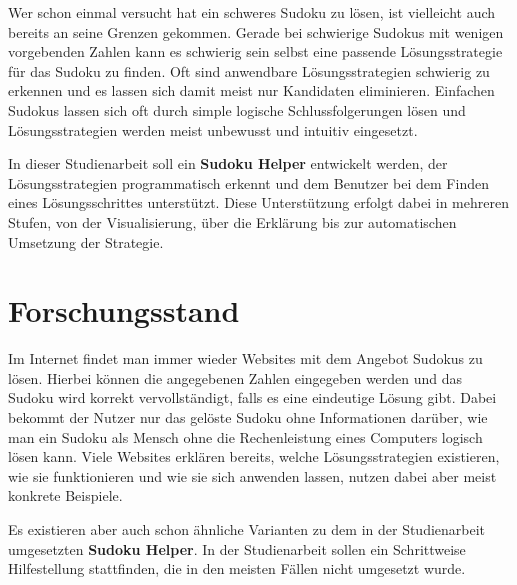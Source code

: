 Wer schon einmal versucht hat ein schweres Sudoku  zu lösen, ist vielleicht auch bereits an seine Grenzen gekommen. Gerade bei schwierige Sudokus mit wenigen vorgebenden Zahlen kann es schwierig sein selbst eine passende Lösungsstrategie für das Sudoku zu finden. Oft sind anwendbare Lösungsstrategien schwierig zu erkennen und es lassen sich damit meist nur Kandidaten eliminieren. Einfachen Sudokus lassen sich oft durch simple logische Schlussfolgerungen lösen und Lösungsstrategien werden meist unbewusst und intuitiv eingesetzt. 

In dieser Studienarbeit soll ein \textbf{Sudoku Helper} entwickelt werden, der Lösungsstrategien programmatisch erkennt und dem Benutzer bei dem Finden eines Lösungsschrittes unterstützt. Diese Unterstützung erfolgt dabei in mehreren Stufen, von der Visualisierung, über die Erklärung bis zur automatischen Umsetzung der Strategie.


\section{Forschungsstand}
Im Internet findet man immer wieder Websites mit dem Angebot Sudokus zu lösen. Hierbei können die angegebenen Zahlen eingegeben werden und das Sudoku wird korrekt vervollständigt, falls es eine eindeutige Lösung gibt. Dabei bekommt der Nutzer nur das gelöste Sudoku ohne Informationen darüber, wie man ein Sudoku als Mensch ohne die Rechenleistung eines Computers logisch lösen kann. Viele Websites erklären bereits, welche Lösungsstrategien existieren, wie sie funktionieren und wie sie sich anwenden lassen, nutzen dabei aber meist konkrete Beispiele.

Es existieren aber auch schon ähnliche Varianten zu dem in der Studienarbeit umgesetzten \textbf{Sudoku Helper}. In der Studienarbeit sollen ein Schrittweise Hilfestellung stattfinden, die in den meisten Fällen nicht umgesetzt wurde. 



